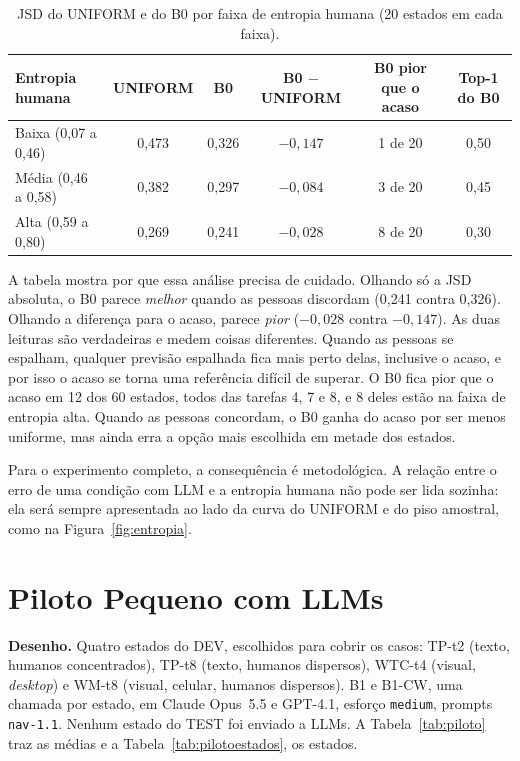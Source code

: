 \documentclass[12pt,oneside,a4paper,chapter=TITLE,english,brazil]{abntex2}
\newcommand{\code}[1]{\texttt{#1}}
\begin{document}
\begin{table}[htb]
\centering
\caption{JSD do UNIFORM e do B0 por faixa de entropia humana (20 estados em cada faixa).}
\label{tab:tercis}
\footnotesize
\begin{tabular}{@{}lccccc@{}}
\toprule
\textbf{Entropia humana} & \textbf{UNIFORM} & \textbf{B0} & \textbf{B0 $-$ UNIFORM} & \textbf{B0 pior que o acaso} & \textbf{Top-1 do B0} \\
\midrule
Baixa (0,07 a 0,46) & 0,473 & 0,326 & $-0{,}147$ & 1 de 20 & 0,50 \\
Média (0,46 a 0,58) & 0,382 & 0,297 & $-0{,}084$ & 3 de 20 & 0,45 \\
Alta (0,59 a 0,80) & 0,269 & 0,241 & $-0{,}028$ & 8 de 20 & 0,30 \\
\bottomrule
\end{tabular}
\end{table}

A tabela mostra por que essa análise precisa de cuidado. Olhando só a JSD absoluta, o B0 parece \emph{melhor} quando as pessoas discordam (0,241 contra 0,326). Olhando a diferença para o acaso, parece \emph{pior} ($-0{,}028$ contra $-0{,}147$). As duas leituras são verdadeiras e medem coisas diferentes. Quando as pessoas se espalham, qualquer previsão espalhada fica mais perto delas, inclusive o acaso, e por isso o acaso se torna uma referência difícil de superar. O B0 fica pior que o acaso em 12 dos 60 estados, todos das tarefas 4, 7 e 8, e 8 deles estão na faixa de entropia alta. Quando as pessoas concordam, o B0 ganha do acaso por ser menos uniforme, mas ainda erra a opção mais escolhida em metade dos estados.

Para o experimento completo, a consequência é metodológica. A relação entre o erro de uma condição com LLM e a entropia humana não pode ser lida sozinha: ela será sempre apresentada ao lado da curva do UNIFORM e do piso amostral, como na Figura~\ref{fig:entropia}.

\section{Piloto Pequeno com LLMs}
\label{sec:piloto}

\begin{real}
\textbf{Desenho.} Quatro estados do DEV, escolhidos para cobrir os casos: TP-t2 (texto, humanos concentrados), TP-t8 (texto, humanos dispersos), WTC-t4 (visual, \textit{desktop}) e WM-t8 (visual, celular, humanos dispersos). B1 e B1-CW, uma chamada por estado, em Claude Opus~5.5 e GPT-4.1, esforço \code{medium}, prompts \code{nav-1.1}. Nenhum estado do TEST foi enviado a LLMs. A Tabela~\ref{tab:piloto} traz as médias e a Tabela~\ref{tab:pilotoestados}, os estados.
\end{real}
\end{document}
